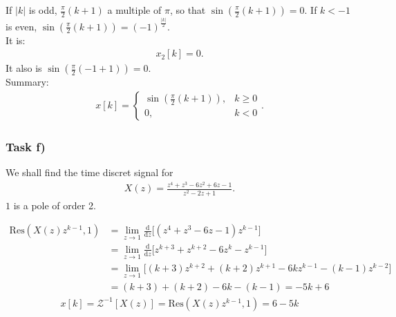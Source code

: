 If $|k|$ is odd, $\frac{\pi}{2}(k+1)$ a multiple of $\pi$, so that $\sin(\frac{\pi}{2}(k+1))=0$.
If $k<-1$ is even, $\sin(\frac{\pi}{2}(k+1))=(-1)^{\frac{|k|}{2}}$.\\
It is:
\begin{align}
	x_2[k]=0.
\end{align}
It also is $\sin(\frac{\pi}{2}(-1+1))=0$. \\
Summary:
\begin{align}
	x[k]=\begin{cases}
		\sin(\frac{\pi}{2}(k+1)), &k\geq 0 \\
		0, &k<0
	\end{cases}.
\end{align}
\subsubsection{Task f)}
We shall find the time discret signal for
\begin{align}
	X(z)=\frac{z^4+z^3-6z^2+6z-1}{z^2-2z+1}.
\end{align}
$1$ is a pole of order 2.

\begin{align}
	\mathrm{Res}(X(z)z^{k-1},1)&=\lim\limits_{z\rightarrow1}\frac{\mathrm{d}}{\mathrm{d}z}\bigg [(z^4+z^3-6z-1)z^{k-1}\bigg]\nonumber\\
	&=\lim\limits_{z\rightarrow1}\frac{\mathrm{d}}{\mathrm{d}z}\bigg[z^{k+3}+z^{k+2}-6z^k-z^{k-1}\bigg]\nonumber\\
	&=\lim\limits_{z\rightarrow1}\bigg[(k+3)z^{k+2}+(k+2)z^{k+1}-6kz^{k-1}-(k-1)z^{k-2}\bigg ]\nonumber\\
	&=(k+3)+(k+2)-6k-(k-1)=-5k+6
\end{align}
\begin{align}
	x[k]=\mathcal{Z}^{-1}[X(z)]=\mathrm{Res}(X(z)z^{k-1},1)=6-5k
\end{align}
